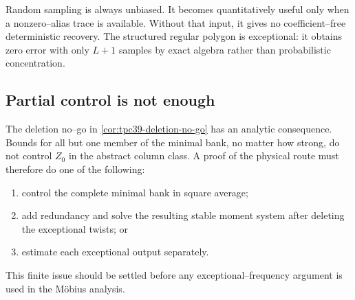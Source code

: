 Random sampling is always unbiased.  It becomes quantitatively useful only
when a nonzero--alias trace is available.  Without that input, it gives no
coefficient--free deterministic recovery.  The structured regular polygon
is exceptional: it obtains zero error with only \(L+1\) samples by exact
algebra rather than probabilistic concentration.

\subsection{Partial control is not enough}

The deletion no--go in \cref{cor:tpc39-deletion-no-go} has an analytic
consequence.  Bounds for all but one member of the minimal bank, no matter
how strong, do not control \(Z_0\) in the abstract column class.  A proof
of the physical route must therefore do one of the following:
\begin{enumerate}[label=(\roman*)]
 \item control the complete minimal bank in square average;
 \item add redundancy and solve the resulting stable moment system after
 deleting the exceptional twists; or
 \item estimate each exceptional output separately.
\end{enumerate}
This finite issue should be settled before any exceptional--frequency
argument is used in the M\"obius analysis.
